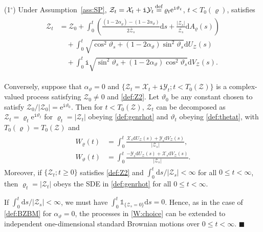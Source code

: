 \documentclass[12pt, twoside]{article}
\numberwithin{figure}{section}
\newcommand{\e}{{\mathrm e}}
\newcommand{\1}{\mathds 1}
\newcommand{\mc}{\mathcal}
\renewcommand{\d}{{\mathrm d}}
\newcommand{\2}{{\mathbf 1}}
\renewcommand{\i}{{\mathtt i}}
\newcommand{\defeq}{{\stackrel{\rm def}{=}}}
\newcommand{\cc}{{^\circ}}
\begin{document}
 
\begin{prop}\label{prop:SP}
{\rm (1$\cc$)} Under Assumption~\ref{ass:SP},  $\mathcal Z_t=\mathcal X_t+\i \mathcal Y_t\,\defeq\,\varrho_t\e^{\i\vartheta_t}$, $t<T_0(\varrho)$, satisfies 
\begin{align}\label{def:Z2}
\begin{split}
\mathcal Z_t&=\mathcal Z_0+\int_0^t\left( \frac{(1-2\alpha_\varrho)-(1-2\alpha_\vartheta)}{2\overline{\mathcal Z}_s}\d s+\frac{|\mathcal Z_s|}{\overline{\mathcal Z_s}}\d A_\varrho(s)\right)\\
&\quad +\int_0^t\sqrt{\cos^2\vartheta_s+(1-2\alpha_\vartheta)\sin^2\vartheta_s}\d U_\mathcal Z(s)\\
&\quad +\int_0^t\i \sqrt{\sin^2\vartheta_s+(1-2\alpha_\vartheta)\cos^2\vartheta_s}\d V_\mathcal Z(s).
\end{split}
\end{align}

\noindent {\rm (2$\cc$)} Conversely, suppose that  $\alpha_\vartheta=0$ and $\{\mathcal Z_t=\mc X_t+\i \mc Y_t;t<T_0(\mathcal Z)\}$ is a complex-valued process satisfying $\mathcal Z_0\neq 0$ and \eqref{def:Z2}. Let $\vartheta_0$ be any constant chosen to satisfy $\mathcal Z_0/|\mathcal Z_0|=\e^{\i\vartheta_0}$. Then for $t<T_0(\mathcal Z)$,  $\mathcal Z_t$ can be decomposed as $\mathcal Z_t=\varrho_t\e^{\i \vartheta_t}$ for
$\varrho_t=|\mathcal Z_t|$ obeying \eqref{def:genrhot} and $\vartheta_t$ obeying \eqref{def:thetat}, with $T_0(\varrho)=T_0(\mc Z)$ and
\begin{align}\label{W:choice}
\begin{split}
W_\varrho(t)&=\int_0^t \frac{\mathcal X_s\d U_\mathcal Z(s)+\mathcal Y_s\d V_\mathcal Z(s) }{|\mathcal Z_s|},\\
 W_\vartheta(t)&=\int_0^t \frac{-\mathcal Y_s\d U_\mathcal Z(s)+\mathcal X_s\d V_\mathcal Z(s)}{|\mathcal Z_s|}.
 \end{split}
\end{align}
Moreover, if $\{\mathcal Z_t;t\geq 0\}$ satisfies \eqref{def:Z2} and $\int_0^t \d s/|\mathcal Z_s|<\infty$ for all $0\leq t<\infty$, then $\varrho_t=|\mathcal Z_t|$ obeys the SDE in \eqref{def:genrhot} for all $0\leq t<\infty$.
\end{prop} 

\begin{rmk}\label{rmk:2dyn}
If $\int_0^t \d s/|\mathcal Z_s|<\infty$, we must have $\int_0^t \1_{\{\mathcal Z_s=0\}}\d s=0$. Hence, as in the case of \eqref{def:BZBM} for $\alpha_\vartheta=0$, the processes in \eqref{W:choice} can be extended to independent one-dimensional standard Brownian motions over $0\leq t<\infty$.
\hfill $\blacksquare$
\end{rmk}
\end{document}
